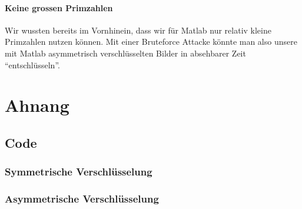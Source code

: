 \documentclass[paper=a4,fontsize=12pt]{scrartcl}
\begin{document}
\paragraph{Keine grossen Primzahlen}
Wir wussten bereits im Vornhinein, dass wir für Matlab nur relativ kleine Primzahlen nutzen können.
Mit einer Bruteforce Attacke könnte man also unsere mit Matlab asymmetrisch verschlüsselten Bilder
in absehbarer Zeit "`entschlüsseln"'. 
 
 
 
 
 
\newpage
\section{Ahnang}
\subsection{Code}
\subsubsection{Symmetrische Verschlüsselung}



\newpage
\subsubsection{Asymmetrische Verschlüsselung}


\end{document}
